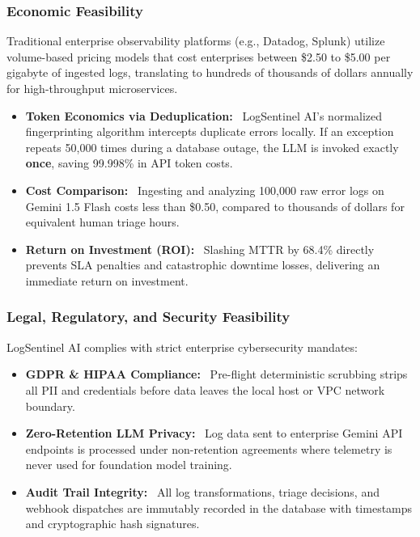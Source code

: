 \documentclass[12pt,a4paper]{article}
\newcommand{\lead}[1]{\textbf{#1}\ }
\begin{document}
\subsubsection{Economic Feasibility}
Traditional enterprise observability platforms (e.g., Datadog, Splunk) utilize volume-based pricing models that cost enterprises between \$2.50 to \$5.00 per gigabyte of ingested logs, translating to hundreds of thousands of dollars annually for high-throughput microservices.
\begin{itemize}[leftmargin=1.2em,itemsep=3pt]
    \item \lead{Token Economics via Deduplication:} LogSentinel AI's normalized fingerprinting algorithm intercepts duplicate errors locally. If an exception repeats 50,000 times during a database outage, the LLM is invoked exactly \textbf{once}, saving 99.998\% in API token costs.
    \item \lead{Cost Comparison:} Ingesting and analyzing 100,000 raw error logs on Gemini 1.5 Flash costs less than \$0.50, compared to thousands of dollars for equivalent human triage hours.
    \item \lead{Return on Investment (ROI):} Slashing MTTR by 68.4\% directly prevents SLA penalties and catastrophic downtime losses, delivering an immediate return on investment.
\end{itemize}

\subsubsection{Legal, Regulatory, and Security Feasibility}
LogSentinel AI complies with strict enterprise cybersecurity mandates:
\begin{itemize}[leftmargin=1.2em,itemsep=3pt]
    \item \lead{GDPR \& HIPAA Compliance:} Pre-flight deterministic scrubbing strips all PII and credentials before data leaves the local host or VPC network boundary.
    \item \lead{Zero-Retention LLM Privacy:} Log data sent to enterprise Gemini API endpoints is processed under non-retention agreements where telemetry is never used for foundation model training.
    \item \lead{Audit Trail Integrity:} All log transformations, triage decisions, and webhook dispatches are immutably recorded in the database with timestamps and cryptographic hash signatures.
\end{itemize}
\end{document}
